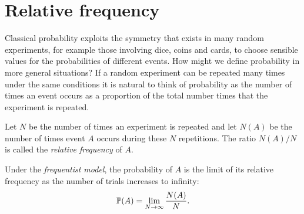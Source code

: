 
\section{Relative frequency}\label{sec:frequentist}

Classical probability exploits the symmetry that exists in many random experiments, for example those involving dice, coins and cards, to choose sensible values for the probabilities of different events. How might we define probability in more general situations? If a random experiment can be repeated many times under the same conditions it is natural to think of probability as the number of times an event occurs as a proportion of the total number times that the experiment is repeated.

\begin{definition}\label{def:relative_frequency}
Let $N$ be the number of times an experiment is repeated and let $N(A)$ be the number of times event $A$ occurs during these $N$ repetitions. The ratio $N(A)/N$ is called the \emph{relative frequency} of $A$. 
\end{definition}

\begin{definition}\label{def:frequentist_probability}
Under the \emph{frequentist model}, the probability of $A$ is the limit of its relative frequency as the number of trials increases to infinity:
\[
\mathbb{P}(A) = \lim_{N\to\infty} \frac{N(A)}{N}.
\]
\end{definition}

